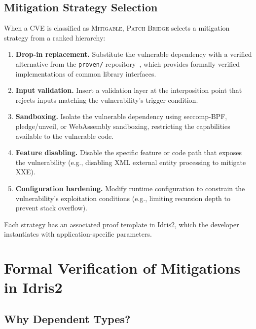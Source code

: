 \documentclass[11pt,twocolumn]{article}
\begin{document}
\subsection{Mitigation Strategy Selection}

When a CVE is classified as \textsc{Mitigable}, \textsc{Patch Bridge}
selects a mitigation strategy from a ranked hierarchy:

\begin{enumerate}[nosep]
  \item \textbf{Drop-in replacement.} Substitute the vulnerable
    dependency with a verified alternative from the \texttt{proven/}
    repository~\cite{proven-repo}, which provides formally verified
    implementations of common library interfaces.
  \item \textbf{Input validation.} Insert a validation layer at the
    interposition point that rejects inputs matching the
    vulnerability's trigger condition.
  \item \textbf{Sandboxing.} Isolate the vulnerable dependency using
    seccomp-BPF, pledge/unveil, or WebAssembly sandboxing, restricting
    the capabilities available to the vulnerable code.
  \item \textbf{Feature disabling.} Disable the specific feature or
    code path that exposes the vulnerability (e.g., disabling XML
    external entity processing to mitigate XXE).
  \item \textbf{Configuration hardening.} Modify runtime configuration
    to constrain the vulnerability's exploitation conditions (e.g.,
    limiting recursion depth to prevent stack overflow).
\end{enumerate}

Each strategy has an associated proof template in Idris2, which the
developer instantiates with application-specific parameters.

\section{Formal Verification of Mitigations in Idris2}
\label{sec:formal}

\subsection{Why Dependent Types?}
\end{document}
